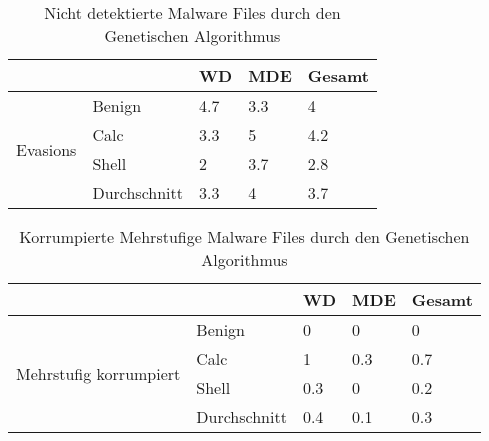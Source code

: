 \begin{table}[]
\begin{tabular}{@{}lllll@{}}
\toprule
                          &              & WD  & MDE & Gesamt \\ \midrule
\multirow{4}{*}{Evasions} & Benign       & 4.7 & 3.3 & 4      \\
                          & Calc         & 3.3 & 5   & 4.2    \\
                          & Shell        & 2   & 3.7 & 2.8    \\
                          & Durchschnitt & 3.3 & 4   & 3.7    \\ \cmidrule(l){2-5} 
\end{tabular}
\caption{Nicht detektierte Malware Files durch den Genetischen Algorithmus}
\label{tab:evasions}
\end{table}

\begin{table}[]
\begin{tabular}{@{}lllll@{}}
\toprule
                                        &              & WD  & MDE & Gesamt \\ \midrule
\multirow{4}{*}{Mehrstufig korrumpiert} & Benign       & 0   & 0   & 0      \\
                                        & Calc         & 1   & 0.3 & 0.7    \\
                                        & Shell        & 0.3 & 0   & 0.2    \\
                                        & Durchschnitt & 0.4 & 0.1 & 0.3    \\ \cmidrule(l){2-5} 
\end{tabular}
\caption{Korrumpierte Mehrstufige Malware Files durch den Genetischen Algorithmus}
\label{tab:multicorruption}
\end{table}
